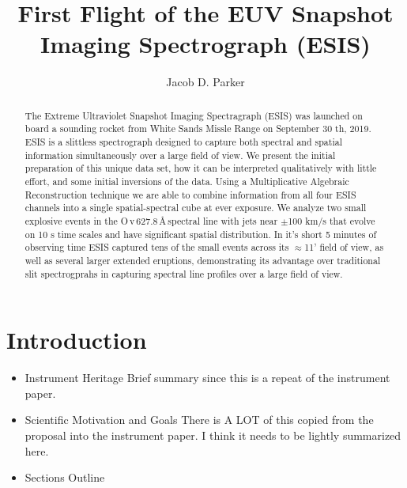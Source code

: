 \renewcommand{\arcsec}{$^{\prime\prime}$} %
\renewcommand{\arcmin}{$^{\prime}$}
\newcommand{\rts}[1]{{\color{violet} RTS: #1}} %
\newcommand{\jdp}[1]{{\color{red} JDP: #1}} %
\newcommand{\cck}[1]{{\color{brown} CCK: #1}} %
\newcommand{\amy}[1]{{\color{cyan} ARW: #1}} 

\newcommand{\spectralline}[3]{#1\,{\sc #2}\,#3\,\AA \,}
\newcommand{\ov}{\spectralline{O}{v}{627.8}}
\newcommand{\mgxbright}{\spectralline{Mg}{x}{609.8}}



\title{First Flight of the EUV Snapshot Imaging Spectrograph (ESIS)}

\author{Jacob D. Parker}

\begin{abstract}
  	The Extreme Ultraviolet Snapshot Imaging Spectragraph (ESIS) was launched on board a sounding rocket from White Sands Missle Range on September 30 th, 2019.
  	ESIS is a slittless spectrograph designed to capture both spectral and spatial information simultaneously over a large field of view.
  	We present the initial preparation of this unique data set, how it can be interpreted qualitatively with little effort, and some initial inversions of the data.
  	Using a Multiplicative Algebraic Reconstruction technique we are able to combine information from all four ESIS channels into a single spatial-spectral cube at ever exposure.
  	We analyze two small explosive events in the \ov spectral line with jets  near $\pm$100 km/s that evolve on 10 s time scales and have significant spatial distribution.
  	In it's short 5 minutes of observing time ESIS captured tens of the small events across its $\approx$11' field of view, as well as several larger extended eruptions, demonstrating its advantage over traditional slit spectrogprahs in capturing spectral line profiles over a large field of view.
  	
\end{abstract} 



\section{Introduction}
	\begin{itemize}
        \item Instrument Heritage
            Brief summary since this is a repeat of the instrument paper.
        \item Scientific Motivation and Goals
            There is A LOT of this copied from the proposal into the instrument paper.  I think it needs to be lightly summarized here.
        \item Sections Outline
    \end{itemize}

